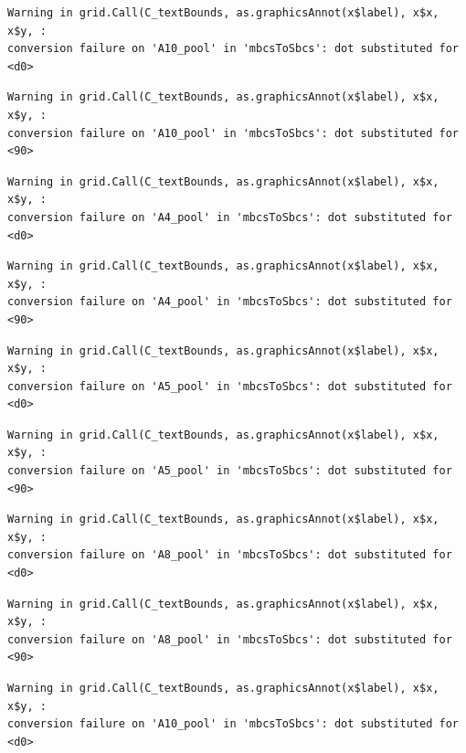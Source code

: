 \documentclass[
  letterpaper,
  DIV=11,
  numbers=noendperiod]{scrartcl}
\begin{document}
\begin{verbatim}
Warning in grid.Call(C_textBounds, as.graphicsAnnot(x$label), x$x, x$y, :
conversion failure on 'А10_pool' in 'mbcsToSbcs': dot substituted for <d0>
\end{verbatim}

\begin{verbatim}
Warning in grid.Call(C_textBounds, as.graphicsAnnot(x$label), x$x, x$y, :
conversion failure on 'А10_pool' in 'mbcsToSbcs': dot substituted for <90>
\end{verbatim}

\begin{verbatim}
Warning in grid.Call(C_textBounds, as.graphicsAnnot(x$label), x$x, x$y, :
conversion failure on 'А4_pool' in 'mbcsToSbcs': dot substituted for <d0>
\end{verbatim}

\begin{verbatim}
Warning in grid.Call(C_textBounds, as.graphicsAnnot(x$label), x$x, x$y, :
conversion failure on 'А4_pool' in 'mbcsToSbcs': dot substituted for <90>
\end{verbatim}

\begin{verbatim}
Warning in grid.Call(C_textBounds, as.graphicsAnnot(x$label), x$x, x$y, :
conversion failure on 'А5_pool' in 'mbcsToSbcs': dot substituted for <d0>
\end{verbatim}

\begin{verbatim}
Warning in grid.Call(C_textBounds, as.graphicsAnnot(x$label), x$x, x$y, :
conversion failure on 'А5_pool' in 'mbcsToSbcs': dot substituted for <90>
\end{verbatim}

\begin{verbatim}
Warning in grid.Call(C_textBounds, as.graphicsAnnot(x$label), x$x, x$y, :
conversion failure on 'А8_pool' in 'mbcsToSbcs': dot substituted for <d0>
\end{verbatim}

\begin{verbatim}
Warning in grid.Call(C_textBounds, as.graphicsAnnot(x$label), x$x, x$y, :
conversion failure on 'А8_pool' in 'mbcsToSbcs': dot substituted for <90>
\end{verbatim}

\begin{verbatim}
Warning in grid.Call(C_textBounds, as.graphicsAnnot(x$label), x$x, x$y, :
conversion failure on 'А10_pool' in 'mbcsToSbcs': dot substituted for <d0>
\end{verbatim}
\end{document}
